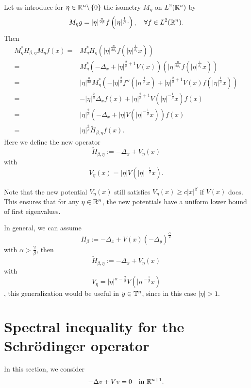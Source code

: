 Let us introduce for $\eta \in \mathbb{R}^{n}\backslash \left\{0\right\} $ the isometry $M_\eta $ on $L^2(\mathbb{R}^{n})$ by
\[
M_{\eta }g= |\eta |^{\frac{n}{2 \beta }}f\left( |\eta |^{\frac{1}{\beta}}\cdot  \right),\quad \forall f\in L^2(\mathbb{R}^{n}). 
\]
Then 
\begin{equation*}
	\begin{aligned}
		M_{\eta }^{*}{H}_{\beta ,\eta }M_{\eta }f(x)=& M_{\eta }^{*}H_{\eta }\left( |\eta |^{ \frac{n}{2 \beta_1}}f\left( |\eta |^{\frac{1}{\beta_1 }}x  \right)  \right) \\
		=& M_{\eta }^{*}\left( -\Delta_x+|\eta |^{\frac{2}{\beta }+1} V(x) \right) \left( |\eta     |^{ \frac{n}{2 \beta_1}}f\left( |\eta |^{\frac{1}{\beta_1 }}x  \right)  \right)\\
		=&|\eta |^{\frac{n}{2\beta }} M_{\eta }^{*} \left( - |\eta |^{\frac{2}{\beta }} f''\left( |\eta |^{\frac{1}{\beta }}x \right) +|\eta |^{\frac{2}{\beta }+1} V(x) f\left( |\eta |^{\frac{1}{\beta }}x \right)  \right)\\
		=& -|\eta |^{\frac{2}{\beta }} \Delta_x f(x)+|\eta |^{\frac{2}{\beta }+1} V\left( |\eta |^{-\frac{1}{\beta }} x\right) f(x)\\
		=& |\eta |^{\frac{2}{\beta }} \left( -\Delta_x+ |\eta | V\left( |\eta |^{-\frac{1}{\beta }}x \right) \right) f(x)\\
		=& |\eta |^{\frac{2}{\beta }}\widetilde{H}_{\beta ,\eta } f(x)
	.\end{aligned}
\end{equation*}
Here we define the new operator
\[
\widetilde{H}_{\beta ,\eta }:=-\Delta_x+V_{\eta }(x)
\] 
with
\[
V_\eta (x)=|\eta |V\left( |\eta |^{-\frac{1}{\beta }}x \right). 
\] 


Note that the new potential $V_{\eta }(x)$ still satisfies  $V_\eta (x)\ge c|x|^{\beta }$ if $V(x)$ does. This ensures that for any $\eta \in \mathbb{R}^{n}$, the new potentials have a uniform lower bound of first eigenvalues.

In general, we can assume 
\begin{equation}
	H_\beta :=-\Delta_x+V(x)\left( -\Delta_y \right) ^{\frac{\alpha }{2}}
\end{equation}
with $\alpha >\frac{2}{\beta }$, then 
\[
\widetilde{H}_{\beta ,\eta }:=-\Delta_x+V_\eta (x)
\] 	
with 
\[
V_{\eta }=|\eta |^{\alpha - \frac{2}{\beta }} V\left( |\eta |^{-\frac{1}{\beta }}x \right) 
\]
, this generalization would be useful in $y\in \mathbb{T} ^{n}$, since in this case $|\eta |>1$.

\section{Spectral inequality for the Schrödinger operator}
In this section, we consider 
\begin{equation}\label{A.1}
	-\Delta v+Vv=0 \quad \text{in } \mathbb{R}^{n+1}.
\end{equation}

